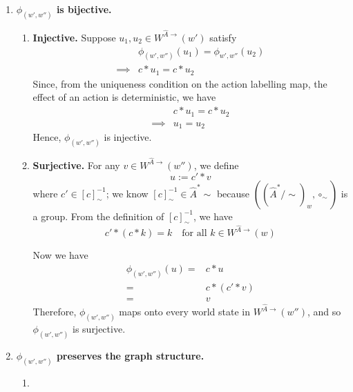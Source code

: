 \begin{proofE}
\begin{enumerate}
\begin{enumerate}
    \item \textbf{$\phi_{(w', w'')}$ is bijective.}
    \begin{enumerate}
        \item \textbf{Injective.}
        Suppose $u_{1}, u_{2} \in W^{\hat{A}\to}(w')$ satisfy
        \begin{align}
            & \phi_{(w', w'')}(u_{1}) = \phi_{w', w''}(u_{2}) \\
            \implies & c \ast u_{1} = c \ast u_{2}
        \end{align}
        Since, from the uniqueness condition on the action labelling map, the effect of an action is deterministic, we have
        \begin{align}
            & c \ast u_{1} = c \ast u_{2} \\
            \implies & u_{1} = u_{2}
        \end{align}
        Hence, $\phi_{(w', w'')}$ is injective.
    
        \item \textbf{Surjective.}
        For any $v \in W^{\hat{A}\to}(w'')$, we define
        \begin{equation}
            u := c' \ast v
        \end{equation}
        where $c' \in [c]^{-1}_{\sim}$; we know $[c]^{-1}_{\sim} \in \hat{A}^{*}\sim$ because $((\hat{A}^{*}/\sim)_{w}, \circ_{\sim})$ is a group.
        From the definition of $[c]^{-1}_{\sim}$, we have
        \begin{equation}
            c' \ast (c \ast k) = k \quad \text{for all $k \in W^{\hat{A}\to}(w)$}
        \end{equation}

        Now we have
        \begin{align}
            \phi_{(w', w'')}(u) = & c \ast u \\
            = & c \ast (c' \ast v) \\
            = & v
        \end{align}
        Therefore, $\phi_{(w', w'')}$ maps onto every world state in $W^{\hat{A}\to}(w'')$, and so $\phi_{(w', w'')}$ is surjective.
    \end{enumerate}

    \item \textbf{$\phi_{(w', w'')}$ preserves the graph structure.}
    \begin{enumerate}
        \item 
    \end{enumerate}
    

    
    \end{enumerate}

    
\end{enumerate}
\end{proofE}








